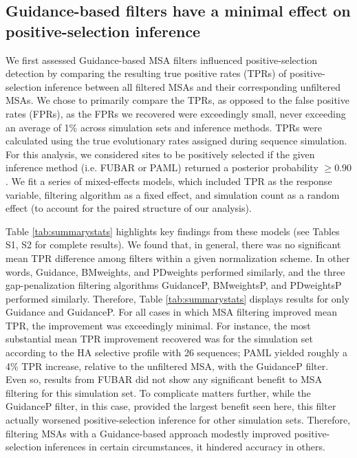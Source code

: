 \documentclass[11pt]{article}
\begin{document}
\subsection*{Guidance-based filters have a minimal effect on positive-selection inference}

We first assessed Guidance-based MSA filters influenced positive-selection detection by comparing the resulting true positive rates (TPRs) of positive-selection inference between all filtered MSAs and their corresponding unfiltered MSAs.  We chose to primarily compare the TPRs, as opposed to the false positive rates (FPRs), as the FPRs we recovered were exceedingly small, never exceeding an average of 1\% across simulation sets and inference methods. TPRs were calculated using the true evolutionary rates assigned during sequence simulation. For this analysis, we considered sites to be positively selected if the given inference method (i.e. FUBAR or PAML) returned a posterior probability $\geq0.90$. We fit a series of mixed-effects models, which included TPR as the response variable, filtering algorithm as a fixed effect, and simulation count as a random effect (to account for the paired structure of our analysis). 

Table \ref{tab:summarystats} highlights key findings from these models (see Tables S1, S2 for complete results). We found that, in general, there was no significant mean TPR difference among filters within a given normalization scheme. In other words, Guidance, BMweights, and PDweights  performed similarly, and the three gap-penalization filtering algorithms GuidanceP, BMweightsP, and PDweightsP performed similarly. Therefore, Table \ref{tab:summarystats} displays results for only Guidance and GuidanceP. For all cases in which MSA filtering improved mean TPR, the improvement was exceedingly minimal. For instance, the most substantial mean TPR improvement recovered was for the simulation set according to the HA selective profile with 26 sequences; PAML yielded roughly a 4\% TPR increase, relative to the unfiltered MSA, with the GuidanceP filter. Even so, results from FUBAR did not show any significant benefit to MSA filtering for this simulation set. To complicate matters further, while the GuidanceP filter, in this case, provided the largest benefit seen here, this filter actually worsened positive-selection inference for other simulation sets. Therefore, filtering MSAs with a Guidance-based approach modestly improved positive-selection inferences in certain circumstances, it hindered accuracy in others.
\end{document}
